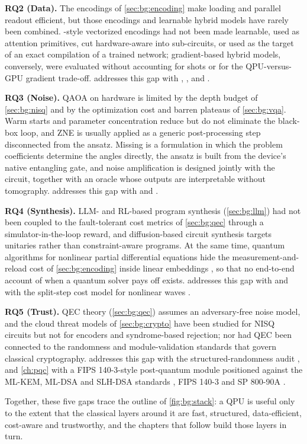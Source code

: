\textbf{RQ2 (Data).} The encodings of \cref{sec:bg:encoding} make loading and parallel readout efficient, but those encodings and learnable hybrid models have rarely been combined. \qcrank{}-style vectorized encodings had not been made learnable, used as attention primitives, cut hardware-aware into sub-circuits, or used as the target of an exact compilation of a trained network; gradient-based hybrid models, conversely, were evaluated without accounting for shots or for the QPU-versus-GPU gradient trade-off.  addresses this gap with \qpie{} \cite{guo2025qpie}, \vqt{} \cite{guo2025vqt}, \shardq{} \cite{guo2025shardq} and \nnqa{} \cite{guo2026nnqa}.

\textbf{RQ3 (Noise).} QAOA on hardware is limited by the depth budget of \cref{sec:bg:nisq} and by the optimization cost and barren plateaus of \cref{sec:bg:vqa}. Warm starts and parameter concentration reduce but do not eliminate the black-box loop, and ZNE is usually applied as a generic post-processing step disconnected from the ansatz. Missing is a formulation in which the problem coefficients determine the angles directly, the ansatz is built from the device's native entangling gate, and noise amplification is designed jointly with the circuit, together with an oracle whose outputs are interpretable without tomography.  addresses this gap with \deal{} \cite{guo2025deal} and \qawa{} \cite{guo2025qawa}.

\textbf{RQ4 (Synthesis).} LLM- and RL-based program synthesis (\cref{sec:bg:llm}) had not been coupled to the fault-tolerant cost metrics of \cref{sec:bg:qec} through a simulator-in-the-loop reward, and diffusion-based circuit synthesis targets unitaries rather than constraint-aware programs. At the same time, quantum algorithms for nonlinear partial differential equations hide the measurement-and-reload cost of \cref{sec:bg:encoding} inside linear embeddings \cite{jin2024schrodingerization}, so that no end-to-end account of when a quantum solver pays off exists.  addresses this gap with \rubriq{} \cite{guo2026rubriq,guo2026rubriqsoftware} and with the split-step cost model for nonlinear waves \cite{guo2026nonlinearwaves,guo2026splitstepqude}.

\textbf{RQ5 (Trust).} QEC theory (\cref{sec:bg:qec}) assumes an adversary-free noise model, and the cloud threat models of \cref{sec:bg:crypto} have been studied for NISQ circuits but not for encoders and syndrome-based rejection; nor had QEC been connected to the randomness and module-validation standards that govern classical cryptography.  addresses this gap with the structured-randomness audit \cite{guo2026qecaudit}, and \cref{ch:pqc} with a FIPS 140-3-style post-quantum module \cite{guo2026lightriderqpc} positioned against the ML-KEM, ML-DSA and SLH-DSA standards \cite{nist2024fips203,nist2024fips204,nist2024fips205}, FIPS 140-3 \cite{nist2019fips1403} and SP 800-90A \cite{nist2015sp80090a}.

Together, these five gaps trace the outline of \cref{fig:bg:stack}: a QPU is useful only to the extent that the classical layers around it are fast, structured, data-efficient, cost-aware and trustworthy, and the chapters that follow build those layers in turn.
